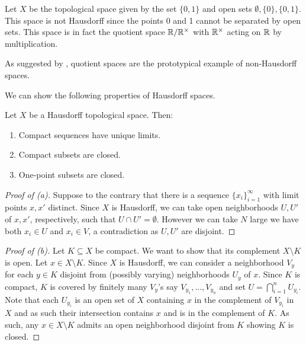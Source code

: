 \begin{example}\label{ex: R by units is not Hausdorff}
    Let $X$ be the topological space given by the set $\{0,1\}$ and open sets $\emptyset, \{0\}, \{0,1\}$. This space is not Hausdorff since the points 0 and 1 cannot be separated by open sets. This space is in fact the quotient space $\mathbb{R}/\mathbb{R}^{\times}$ with $\mathbb{R}^{\times}$ acting on $\mathbb{R}$ by multiplication. 
\end{example}
\begin{remark}
    As suggested by , quotient spaces are the prototypical example of non-Hausdorff spaces. 
\end{remark}
We can show the following properties of Hausdorff spaces. 
\begin{proposition}\label{prop: properties of Hausdorff spaces}
    Let $X$ be a Hausdorff topological space. Then:
    \begin{enumerate}[label=(\roman*)]
        \item Compact sequences have unique limits. 
        \item Compact subsets are closed. 
        \item One-point subsets are closed. 
    \end{enumerate}
\end{proposition}
\begin{proof}[Proof of (a)]
    Suppose to the contrary that there is a sequence $\{x_{i}\}_{i=1}^{\infty}$ with limit points $x,x'$ distinct. Since $X$ is Hausdorff, we can take open neighborhoods $U,U'$ of $x,x'$, respectively, such that $U\cap U'=\emptyset$. However we can take $N$ large we have both $x_{i}\in U$ and $x_{i}\in V$, a contradiction as $U,U'$ are disjoint. 
\end{proof}
\begin{proof}[Proof of (b)]
    Let $K\subseteq X$ be compact. We want to show that its complement $X\setminus K$ is open. Let $x\in X\setminus K$. Since $X$ is Hausdorff, we can consider a neighborhood $V_{y}$ for each $y\in K$ disjoint from (possibly varying) neighborhoods $U_{y}$ of $x$. Since $K$ is compact, $K$ is covered by finitely many $V_{y}$'s say $V_{y_{1}},\dots,V_{y_{n}}$ and set $U=\bigcap_{i=1}^{n}U_{y_{i}}$. Note that each $U_{y_{i}}$ is an open set of $X$ containing $x$ in the complement of $V_{y_{i}}$ in $X$ and as such their intersection contains $x$ and is in the complement of $K$. As such, any $x\in X\setminus K$ admits an open neighborhood disjoint from $K$ showing $K$ is closed.
\end{proof}
